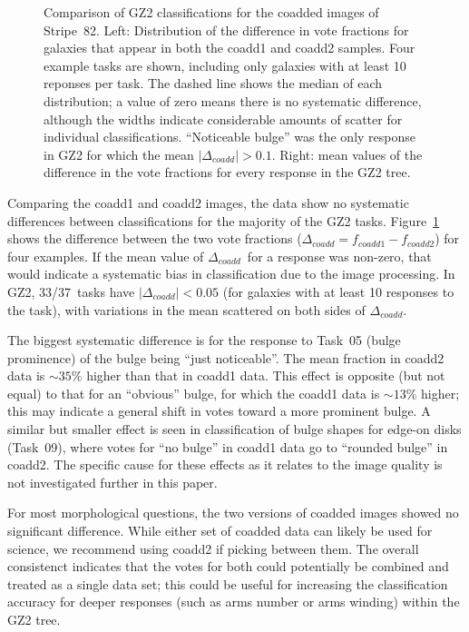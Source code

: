 \documentclass[useAMS,usenatbib]{mn2e}
\newcommand{\dcoadd}{$\Delta_{coadd}$}
\begin{document}
\begin{figure}
\caption{Comparison of GZ2 classifications for the coadded images of Stripe~82. Left: Distribution of the difference in vote fractions for galaxies that appear in both the coadd1 and coadd2 samples. Four example tasks are shown, including only galaxies with at least 10 reponses per task. The dashed line shows the median of each distribution; a value of zero means there is no systematic difference, although the widths indicate considerable amounts of scatter for individual classifications. ``Noticeable bulge'' was the only response in GZ2 for which the mean $|\Delta_{coadd}| > 0.1$. Right: mean values of the difference in the vote fractions for every response in the GZ2 tree. 
\label{fig-stripe82_compare}}
\end{figure}

Comparing the coadd1 and coadd2 images, the data show no systematic differences between classifications for the majority of the GZ2 tasks. Figure~\ref{fig-stripe82_compare} shows the difference between the two vote fractions ($\Delta_{coadd} = f_{coadd1} - f_{coadd2}$) for four examples. If the mean value of \dcoadd~for a response was non-zero, that would indicate a systematic bias in classification due to the image processing. In GZ2, 33/37~tasks have $|\Delta_{coadd}| < 0.05$ (for galaxies with at least 10 responses to the task), with variations in the mean scattered on both sides of \dcoadd. 

The biggest systematic difference is for the response to Task~05 (bulge prominence) of the bulge being ``just noticeable''. The mean fraction in coadd2 data is $\sim35\%$ higher than that in coadd1 data. This effect is opposite (but not equal) to that for an ``obvious'' bulge, for which the coadd1 data is $\sim13\%$ higher; this may indicate a general shift in votes toward a more prominent bulge. A similar but smaller effect is seen in classification of bulge shapes for edge-on disks (Task~09), where votes for ``no bulge'' in coadd1 data go to ``rounded bulge'' in coadd2. The specific cause for these effects as it relates to the image quality is not investigated further in this paper. 

For most morphological questions, the two versions of coadded images showed no significant difference. While either set of coadded data can likely be used for science, we recommend using coadd2 if picking between them. The overall consistenct indicates that the votes for both could potentially be combined and treated as a single data set; this could be useful for increasing the classification accuracy for deeper responses (such as arms number or arms winding) within the GZ2 tree.
\end{document}
